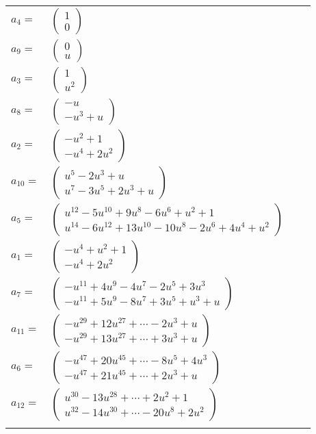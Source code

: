 \documentclass[1p]{elsarticle_modified}
\theoremstyle{definition}
\begin{document}
\begin{tabular}{m{7pt} m{180pt} m{7pt} m{180pt} }
\flushright $a_{4}=$&$\begin{pmatrix}1\\0\end{pmatrix}$ \\
\flushright $a_{9}=$&$\begin{pmatrix}0\\u\end{pmatrix}$ \\
\flushright $a_{3}=$&$\begin{pmatrix}1\\u^2\end{pmatrix}$ \\
\flushright $a_{8}=$&$\begin{pmatrix}- u\\- u^3+u\end{pmatrix}$ \\
\flushright $a_{2}=$&$\begin{pmatrix}- u^2+1\\- u^4+2 u^2\end{pmatrix}$ \\
\flushright $a_{10}=$&$\begin{pmatrix}u^5-2 u^3+u\\u^7-3 u^5+2 u^3+u\end{pmatrix}$ \\
\flushright $a_{5}=$&$\begin{pmatrix}u^{12}-5 u^{10}+9 u^8-6 u^6+u^2+1\\u^{14}-6 u^{12}+13 u^{10}-10 u^8-2 u^6+4 u^4+u^2\end{pmatrix}$ \\
\flushright $a_{1}=$&$\begin{pmatrix}- u^4+u^2+1\\- u^4+2 u^2\end{pmatrix}$ \\
\flushright $a_{7}=$&$\begin{pmatrix}- u^{11}+4 u^9-4 u^7-2 u^5+3 u^3\\- u^{11}+5 u^9-8 u^7+3 u^5+u^3+u\end{pmatrix}$ \\
\flushright $a_{11}=$&$\begin{pmatrix}- u^{29}+12 u^{27}+\cdots-2 u^3+u\\- u^{29}+13 u^{27}+\cdots+3 u^3+u\end{pmatrix}$ \\
\flushright $a_{6}=$&$\begin{pmatrix}- u^{47}+20 u^{45}+\cdots-8 u^5+4 u^3\\- u^{47}+21 u^{45}+\cdots+2 u^3+u\end{pmatrix}$ \\
\flushright $a_{12}=$&$\begin{pmatrix}u^{30}-13 u^{28}+\cdots+2 u^2+1\\u^{32}-14 u^{30}+\cdots-20 u^8+2 u^2\end{pmatrix}$\\&\end{tabular}
\end{document}
